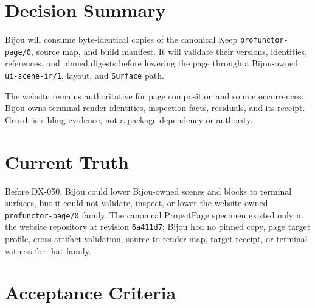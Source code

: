 \section{Decision Summary}\label{record-146-decision-summary}

Bijou will consume byte-identical copies of the canonical Keep \texttt{p\allowbreak{}r\allowbreak{}o\allowbreak{}f\allowbreak{}u\allowbreak{}n\allowbreak{}c\allowbreak{}t\allowbreak{}o\allowbreak{}r\allowbreak{}-\allowbreak{}p\allowbreak{}a\allowbreak{}g\allowbreak{}e\allowbreak{}/\allowbreak{}0}, source map, and build manifest. It will validate their versions, identities, references, and pinned digests before lowering the page through a Bijou-owned \texttt{u\allowbreak{}i\allowbreak{}-\allowbreak{}s\allowbreak{}c\allowbreak{}e\allowbreak{}n\allowbreak{}e\allowbreak{}-\allowbreak{}i\allowbreak{}r\allowbreak{}/\allowbreak{}1}, layout, and \texttt{S\allowbreak{}u\allowbreak{}r\allowbreak{}f\allowbreak{}a\allowbreak{}c\allowbreak{}e} path.

The website remains authoritative for page composition and source occurrences. Bijou owns terminal render identities, inspection facts, residuals, and its receipt. Geordi is sibling evidence, not a package dependency or authority.

\section{Current Truth}\label{record-146-current-truth}

Before DX-050, Bijou could lower Bijou-owned scenes and blocks to terminal surfaces, but it could not validate, inspect, or lower the website-owned \texttt{p\allowbreak{}r\allowbreak{}o\allowbreak{}f\allowbreak{}u\allowbreak{}n\allowbreak{}c\allowbreak{}t\allowbreak{}o\allowbreak{}r\allowbreak{}-\allowbreak{}p\allowbreak{}a\allowbreak{}g\allowbreak{}e\allowbreak{}/\allowbreak{}0} family. The canonical ProjectPage specimen existed only in the website repository at revision \texttt{6\allowbreak{}a\allowbreak{}4\allowbreak{}1\allowbreak{}1\allowbreak{}d\allowbreak{}7}; Bijou had no pinned copy, page target profile, cross-artifact validation, source-to-render map, target receipt, or terminal witness for that family.

\section{Acceptance Criteria}\label{record-146-acceptance-criteria}

